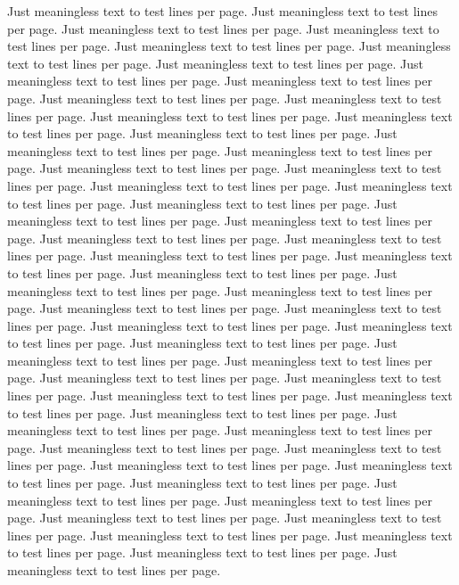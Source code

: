 Just meaningless text to test lines per page.
Just meaningless text to test lines per page.
Just meaningless text to test lines per page.
Just meaningless text to test lines per page.
Just meaningless text to test lines per page.
Just meaningless text to test lines per page.
Just meaningless text to test lines per page.
Just meaningless text to test lines per page.
Just meaningless text to test lines per page.
Just meaningless text to test lines per page.
Just meaningless text to test lines per page.
Just meaningless text to test lines per page.
Just meaningless text to test lines per page.
Just meaningless text to test lines per page.
Just meaningless text to test lines per page.
Just meaningless text to test lines per page.
Just meaningless text to test lines per page.
Just meaningless text to test lines per page.
Just meaningless text to test lines per page.
Just meaningless text to test lines per page.
Just meaningless text to test lines per page.
Just meaningless text to test lines per page.
Just meaningless text to test lines per page.
Just meaningless text to test lines per page.
Just meaningless text to test lines per page.
Just meaningless text to test lines per page.
Just meaningless text to test lines per page.
Just meaningless text to test lines per page.
Just meaningless text to test lines per page.
Just meaningless text to test lines per page.
Just meaningless text to test lines per page.
Just meaningless text to test lines per page.
Just meaningless text to test lines per page.
Just meaningless text to test lines per page.
Just meaningless text to test lines per page.
Just meaningless text to test lines per page.
Just meaningless text to test lines per page.
Just meaningless text to test lines per page.
Just meaningless text to test lines per page.
Just meaningless text to test lines per page.
Just meaningless text to test lines per page.
Just meaningless text to test lines per page.
Just meaningless text to test lines per page.
Just meaningless text to test lines per page.
Just meaningless text to test lines per page.
Just meaningless text to test lines per page.
Just meaningless text to test lines per page.
Just meaningless text to test lines per page.
Just meaningless text to test lines per page.
Just meaningless text to test lines per page.
Just meaningless text to test lines per page.
Just meaningless text to test lines per page.
Just meaningless text to test lines per page.
Just meaningless text to test lines per page.
Just meaningless text to test lines per page.
Just meaningless text to test lines per page.
Just meaningless text to test lines per page.
